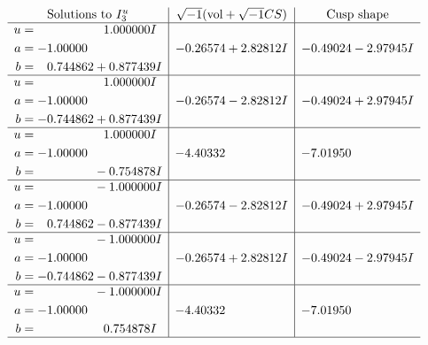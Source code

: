 \documentclass[1p]{elsarticle_modified}
\theoremstyle{definition}
\newcommand{\I}{\sqrt{-1}}
\begin{document}
$$\begin{array}{c|c|c}  
\text{Solutions to }I^u_{3}& \I (\text{vol} + \sqrt{-1}CS) & \text{Cusp shape}\\
 \hline 
\begin{aligned}
u &= \phantom{-0.000000 -}1.000000 I \\
a &= -1.00000\phantom{ +0.000000I} \\
b &= \phantom{-}0.744862 + 0.877439 I\end{aligned}
 & -0.26574 + 2.82812 I & -0.49024 - 2.97945 I \\ \hline\begin{aligned}
u &= \phantom{-0.000000 -}1.000000 I \\
a &= -1.00000\phantom{ +0.000000I} \\
b &= -0.744862 + 0.877439 I\end{aligned}
 & -0.26574 - 2.82812 I & -0.49024 + 2.97945 I \\ \hline\begin{aligned}
u &= \phantom{-0.000000 -}1.000000 I \\
a &= -1.00000\phantom{ +0.000000I} \\
b &= \phantom{-0.000000 } -0.754878 I\end{aligned}
 & -4.40332\phantom{ +0.000000I} & -7.01950\phantom{ +0.000000I} \\ \hline\begin{aligned}
u &= \phantom{-0.000000 } -1.000000 I \\
a &= -1.00000\phantom{ +0.000000I} \\
b &= \phantom{-}0.744862 - 0.877439 I\end{aligned}
 & -0.26574 - 2.82812 I & -0.49024 + 2.97945 I \\ \hline\begin{aligned}
u &= \phantom{-0.000000 } -1.000000 I \\
a &= -1.00000\phantom{ +0.000000I} \\
b &= -0.744862 - 0.877439 I\end{aligned}
 & -0.26574 + 2.82812 I & -0.49024 - 2.97945 I \\ \hline\begin{aligned}
u &= \phantom{-0.000000 } -1.000000 I \\
a &= -1.00000\phantom{ +0.000000I} \\
b &= \phantom{-0.000000 -}0.754878 I\end{aligned}
 & -4.40332\phantom{ +0.000000I} & -7.01950\phantom{ +0.000000I}\\
 \hline 
 \end{array}$$\newpage
\end{document}
